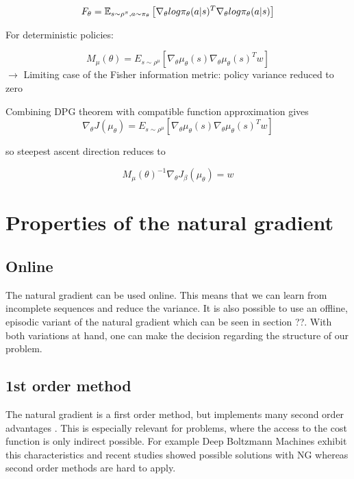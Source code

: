 \begin{equation}
	F_\theta=\operatorname{\mathbb{E}}_{s\sim\rho^{\pi},a\sim\pi_{\theta}}\left[\nabla_{\theta}log\pi_{\theta}(a|s)^{T}\nabla_{\theta}log\pi_{\theta}(a|s)\right]
\end{equation}

\noindent For deterministic policies: 

\begin{equation}
	M_{\mu}(\theta)=E_{s\sim\rho^{\mu}}[\nabla_{\theta}\mu_{\theta}(s)\nabla_{\theta}\mu_{\theta}(s)^{T}w]
\end{equation}
\noindent$\rightarrow$ Limiting case of the Fisher information metric: policy variance reduced to zero


\noindent Combining DPG theorem with compatible function approximation gives 
\begin{equation}
\nabla_{\theta}J(\mu_{\theta}) = E_{s\sim\rho^{\mu}}[\nabla_{\theta} \mu_{\theta}(s) \nabla_{\theta} \mu_{\theta}(s)^{T}w]
\end{equation} 

\noindent so steepest ascent direction reduces to

\begin{equation}
M_{\mu}(\theta)^{-1}\nabla_{\theta}J_{\beta}(\mu_{\theta})=w
\end{equation} 


\newpage
\section{Properties of the natural gradient}

\subsection{Online}
The natural gradient can be used online. This means that we can learn from incomplete sequences and reduce the variance. It is also possible to use an offline, episodic variant of the natural gradient which can be seen in section ??. With both variations at hand, one can make the decision regarding the structure of our problem. \cite{pascanu2013revisiting, peters2008natural}

\subsection{1st order method}
The natural gradient is a first order method, but implements many second order advantages \cite{pascanu2013revisiting}. This is especially relevant for problems,  where the access to the cost function is only indirect possible. For example Deep Boltzmann Machines exhibit this characteristics and recent studies showed possible solutions with NG \cite{desjardins2013metric} whereas second order  methods are hard to apply.

